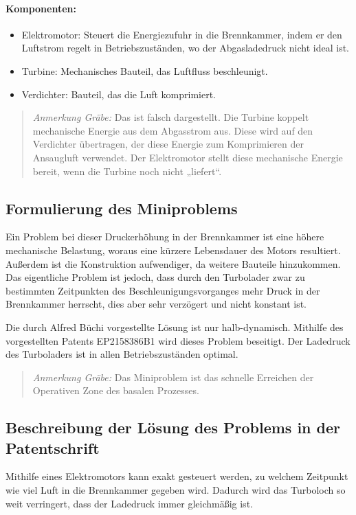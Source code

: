 \documentclass[11pt,a4paper]{article}
\newcommand{\HGG}[1]{\begin{quote} \emph{Anmerkung Gräbe:} #1  \end{quote}}
\begin{document}
\paragraph{Komponenten:}
\begin{itemize}
\item Elektromotor: Steuert die Energiezufuhr in die Brennkammer, indem er den
  Luftstrom regelt in Betriebszuständen, wo der Abgasladedruck nicht ideal
  ist.
\item Turbine: Mechanisches Bauteil, das Luftfluss beschleunigt.
\item Verdichter: Bauteil, das die Luft komprimiert. 
\end{itemize}

\HGG{Das ist falsch dargestellt. Die Turbine koppelt mechanische Energie aus
  dem Abgasstrom aus. Diese wird auf den Verdichter übertragen, der diese
  Energie zum Komprimieren der Ansaugluft verwendet.  Der Elektromotor stellt
  diese mechanische Energie bereit, wenn die Turbine noch nicht „liefert“. }
  
\subsection{Formulierung des Miniproblems}
Ein Problem bei dieser Druckerhöhung in der Brennkammer ist eine höhere
mechanische Belastung, woraus eine kürzere Lebensdauer des Motors resultiert.
Außerdem ist die Konstruktion aufwendiger, da weitere Bauteile hinzukommen.
Das eigentliche Problem ist jedoch, dass durch den Turbolader zwar zu
bestimmten Zeitpunkten des Beschleunigungsvorganges mehr Druck in der
Brennkammer herrscht, dies aber sehr verzögert und nicht konstant ist.

Die durch Alfred Büchi vorgestellte Lösung ist nur halb-dynamisch. Mithilfe
des vorgestellten Patents EP2158386B1 wird dieses Problem beseitigt. Der
Ladedruck des Turboladers ist in allen Betriebszuständen optimal.

\HGG{Das Miniproblem ist das schnelle Erreichen der Operativen Zone des
  basalen Prozesses.}

\subsection{Beschreibung der Lösung des Problems in der Patentschrift}

Mithilfe eines Elektromotors kann exakt gesteuert werden, zu welchem Zeitpunkt
wie viel Luft in die Brennkammer gegeben wird. Dadurch wird das Turboloch so
weit verringert, dass der Ladedruck immer gleichmäßig ist.
\end{document}
